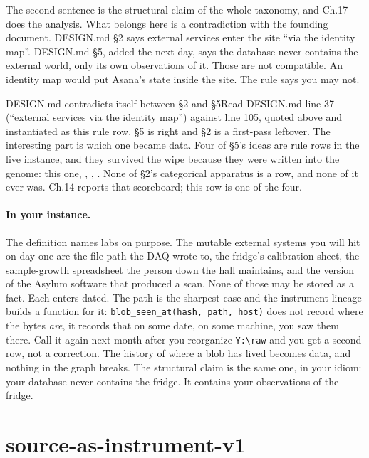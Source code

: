 The second sentence is the structural claim of the whole taxonomy, and Ch.17 does the analysis. What belongs here is a contradiction with the founding document. DESIGN.md \S2 says external services enter the site ``via the identity map''. DESIGN.md \S5, added the next day, says the database never contains the external world, only its own observations of it. Those are not compatible. An identity map would put Asana's state inside the site. The rule says you may not.

\begin{Correspondence}{DESIGN.md contradicts itself between \S2 and \S5}{Read DESIGN.md line 37 (``external services via the identity map'') against line 105, quoted above and instantiated as this rule row.}
\S5 is right and \S2 is a first-pass leftover. The interesting part is which one became data. Four of \S5's ideas are rule rows in the live instance, and they survived the wipe because they were written into the genome: this one, , , . None of \S2's categorical apparatus is a row, and none of it ever was. Ch.14 reports that scoreboard; this row is one of the four.
\end{Correspondence}

\paragraph{In your instance.} The definition names labs on purpose. The mutable external systems you will hit on day one are the file path the DAQ wrote to, the fridge's calibration sheet, the sample-growth spreadsheet the person down the hall maintains, and the version of the Asylum software that produced a scan. None of those may be stored as a fact. Each enters dated. The path is the sharpest case and the instrument lineage builds a function for it: \texttt{blob\_seen\_at(hash, path, host)} does not record where the bytes \emph{are}, it records that on some date, on some machine, you saw them there. Call it again next month after you reorganize \texttt{Y:\textbackslash raw} and you get a second row, not a correction. The history of where a blob has lived becomes data, and nothing in the graph breaks. The structural claim is the same one, in your idiom: your database never contains the fridge. It contains your observations of the fridge.

\section{source-as-instrument-v1}

